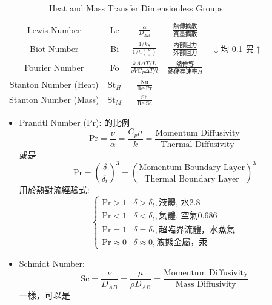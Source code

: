 \documentclass[../main.tex]{subfiles}
\begin{document}
\begin{itemize}
\begin{table}[H]
\begin{tabular}{c|c|c|c|c}
    Lewis Number & Le & $\frac{\alpha}{D_{AB}}$
     & $\frac{\text{熱傳擴散}}{\text{質量擴散}}$&\\
    Biot Number & Bi & $\frac{1/k_S}{1/h\left(\frac{V}{A}\right)}$
      & $\frac{\text{內部阻力}}{\text{外部阻力}}$ & $\downarrow$均-0.1-異$\uparrow$ \\
    Fourier Number & Fo & $\frac{kA\Delta T/L}{\rho V C_P \Delta T/t}$
      & $\frac{\text{熱傳導}}{\text{熱儲存速率}\dot H}$&\\
    Stanton Number (Heat) & $\text{St}_H$ & $\frac{\text{Nu}}{\text{Re}\cdot\text{Pr}}$
      && \\
    Stanton Number (Mass) & $\text{St}_M$ & $\frac{\text{Sh}}{\text{Re}\cdot\text{Sc}}$
      &&
  \end{tabular}
  \caption{Heat and Mass Transfer Dimensionless Groups}
\end{table}
\begin{itemize}
  \item Prandtl Number (Pr): 的比例
    \begin{equation}
      \text{Pr} = \frac{\nu}{\alpha} = \frac{C_p\mu}{k} = \frac{\text{Momentum Diffusivity}}{\text{Thermal Diffusivity}}
    \end{equation}
    或是
    \begin{equation}
      \text{Pr} = \left(\frac{\delta}{\delta_t}\right)^3 = \left(\frac{\text{Momentum Boundary Layer}}{\text{Thermal Boundary Layer}}\right)^3
    \end{equation}
    用於熱對流經驗式:
    \begin{equation}
      \begin{cases}
        \text{Pr} > 1 & \delta > \delta_t, \text{液體, 水2.8} \\
        \text{Pr} < 1 & \delta < \delta_t, \text{氣體, 空氣0.686} \\
        \text{Pr} = 1 & \delta = \delta_t, \text{超臨界流體，水蒸氣}\\
        \text{Pr} \approx 0 & \delta \approx 0, \text{液態金屬，汞}
      \end{cases}
    \end{equation}
  \item Schmidt Number:
    \begin{equation}
      \text{Sc} = \frac{\nu}{D_{AB}} = \frac{\mu}{\rho D_{AB}} = \frac{\text{Momentum Diffusivity}}{\text{Mass Diffusivity}}
    \end{equation}
    一樣，可以是

\end{itemize}
\end{itemize}
\end{document}
